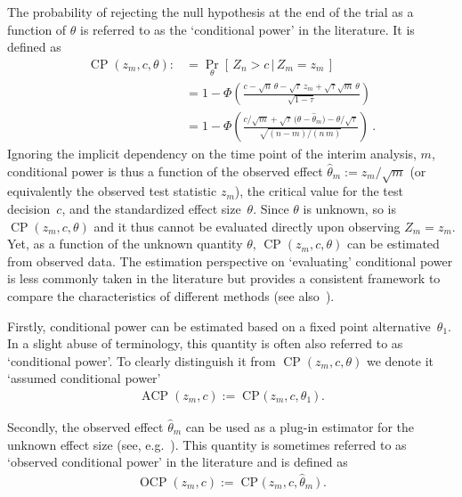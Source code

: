 \documentclass{article}
\renewcommand{\Pr}{\operatorname{Pr}}
\newcommand{\CP}{\ensuremath{\operatorname{CP}}}
\newcommand{\ACP}{\ensuremath{\operatorname{ACP}}}
\newcommand{\OCP}{\ensuremath{\operatorname{OCP}}}
\renewcommand{\Pr}{\ensuremath{\operatorname{Pr}}}
\newcommand{\cond}{\ensuremath{\,|\,}}
\begin{document}
The probability of rejecting the null hypothesis at the end of the trial 
as a function of $\theta$ is referred to as the `conditional power' in the literature.
It is defined as
\begin{align}
    \CP(z_m, c, \theta) :&= \Pr_\theta[\,Z_n > c \cond Z_m = z_m\,] \\
        &= 1 - \Phi\left(
            \frac{c - \sqrt{n}\,\theta - \sqrt{\tau} \, z_m + \sqrt{\tau}\sqrt{m}\,\theta
            }{\sqrt{1 - \tau}}
        \right) \\
        &= 1 - \Phi\left(
            \frac{c/\sqrt{m} + \sqrt{\tau}\,\big(\theta - \widehat{\theta}_m\big) - \theta/\sqrt{\tau}
            }{\sqrt{(n - m)/(n\,m)}}
        \right)      \ .
\end{align}
Ignoring the implicit dependency on the time point of the interim analysis, $m$, 
conditional power is thus a function of the observed effect $\widehat{\theta}_m:=z_m/\sqrt{m}$ 
(or equivalently the observed test statistic $z_m$), the critical value for the test decision~$c$, 
and the standardized effect size~$\theta$.  
Since $\theta$ is unknown, 
so is $\CP(z_m, c, \theta)$ and it thus cannot be 
evaluated directly upon observing $Z_m=z_m$.
Yet, as a function of the unknown quantity $\theta$, 
$\CP(z_m, c, \theta)$ can be estimated from observed data.
The estimation perspective on `evaluating' conditional power is 
less commonly taken in the literature but provides a consistent framework to
compare the characteristics of different methods 
(see also~\citep[Discussion]{bauer2006}). 

Firstly, conditional power can be estimated based on a fixed point alternative~$\theta_1$.
In a slight abuse of terminology, 
this quantity is often also referred to as `conditional power'.
To clearly distinguish it from $\CP(z_m, c, \theta)$ we denote 
it `assumed conditional power'
\begin{align}
    \ACP(z_m,c) := \CP\big(\, z_m, c, \theta_1 \,\big) \ .
\end{align}

Secondly, the observed effect $\widehat{\theta}_m$ can be used 
as a plug-in estimator for the unknown effect size
(see, e.g.~\citep{proschan1995}).
This quantity is sometimes referred to as `observed conditional power'
in the literature and is defined as
\begin{align}
    \OCP(z_m, c) := \CP\big(\, z_m, c, \widehat{\theta}_m \,\big) \ .
\end{align}
\end{document}
